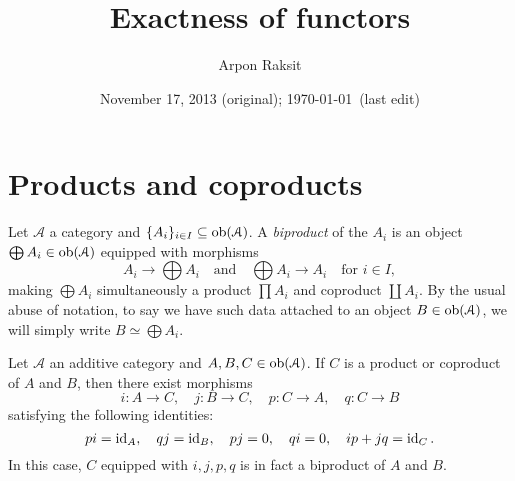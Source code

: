 


\title{Exactness of functors}
\author{Arpon Raksit}
\date{November 17, 2013 (original); \today\ (last edit)}


\maketitle
\thispagestyle{fancy}


\renewcommand{\A}{\mathcal{A}}
\renewcommand{\B}{\mathcal{B}}


\section{Products and coproducts}

\begin{definition}
  \label{biproduct}
  Let $\A$ a category and $\{A_i\}_{i \in I} \subseteq \ob(\A)$. A
  \emph{biproduct} of the $A_i$ is an object $\bigoplus A_i \in
  \ob(\A)$ equipped with morphisms
  \[
  \textstyle{A_i \to \bigoplus A_i \quad\text{and}\quad \bigoplus A_i
    \to A_i \quad \text{for }i \in I,}
  \]
  making $\bigoplus A_i$ simultaneously a product $\prod A_i$ and
  coproduct $\coprod A_i$. By the usual abuse of notation, to say we
  have such data attached to an object $B \in \ob(\A)$, we will simply
  write $B \simeq \bigoplus A_i$.
\end{definition}

\begin{lemma}
  \label{biproduct-formulae}
  Let $\A$ an additive category and $A,B,C \in \ob(\A)$. If $C$ is a
  product or coproduct of $A$ and $B$, then there exist morphisms
  \[
  i : A \to C, \quad j : B \to C, \quad p : C \to A, \quad q : C \to B
  \]
  satisfying the following identities:
  \[
  pi = \operatorname{id}_A, \quad qj = \operatorname{id}_B, \quad pj = 0, \quad qi = 0, \quad
  ip+jq = \operatorname{id}_C.
  \]
  In this case, $C$ equipped with $i,j,p,q$ is in fact a biproduct of
  $A$ and $B$.
\end{lemma}

